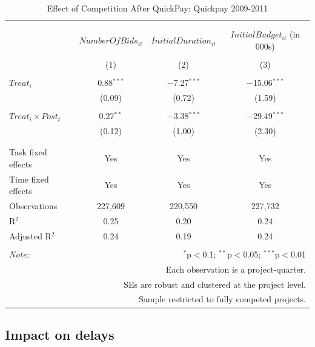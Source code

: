\documentclass[
]{article}
\begin{document}
\begin{table}[H] \centering 
  \caption{Effect of Competition After QuickPay: Quickpay 2009-2011} 
  \label{} 
\small 
\begin{tabular}{@{\extracolsep{0pt}}lccc} 
\\[-1.8ex]\hline 
\hline \\[-1.8ex] 
\\[-1.8ex] & $NumberOfBids_{it}$ & $InitialDuration_{it}$ & $InitialBudget_{it}$ (in 000s) \\ 
\\[-1.8ex] & (1) & (2) & (3)\\ 
\hline \\[-1.8ex] 
 $Treat_i$ & 0.88$^{***}$ & $-$7.27$^{***}$ & $-$15.06$^{***}$ \\ 
  & (0.09) & (0.72) & (1.59) \\ 
  & & & \\ 
 $Treat_i \times Post_t$ & 0.27$^{**}$ & $-$3.38$^{***}$ & $-$29.49$^{***}$ \\ 
  & (0.12) & (1.00) & (2.30) \\ 
  & & & \\ 
\hline \\[-1.8ex] 
Task fixed effects & Yes & Yes & Yes \\ 
Time fixed effects & Yes & Yes & Yes \\ 
Observations & 227,609 & 220,550 & 227,732 \\ 
R$^{2}$ & 0.25 & 0.20 & 0.24 \\ 
Adjusted R$^{2}$ & 0.24 & 0.19 & 0.24 \\ 
\hline 
\hline \\[-1.8ex] 
\textit{Note:}  & \multicolumn{3}{r}{$^{*}$p$<$0.1; $^{**}$p$<$0.05; $^{***}$p$<$0.01} \\ 
 & \multicolumn{3}{r}{Each observation is a project-quarter.} \\ 
 & \multicolumn{3}{r}{SEs are robust and clustered at the project level.} \\ 
 & \multicolumn{3}{r}{Sample restricted to fully competed projects.} \\ 
\end{tabular} 
\end{table}

\hypertarget{impact-on-delays}{%
\subsection{Impact on delays}\label{impact-on-delays}}
\end{document}

